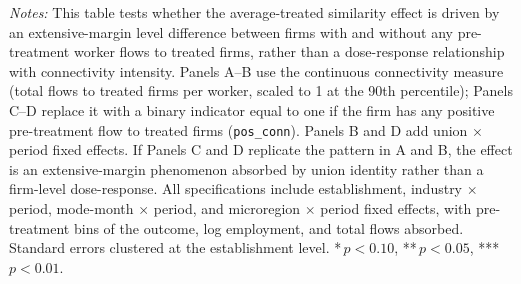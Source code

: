 \begin{table}[H]
\begin{minipage}{\linewidth}
\scriptsize\textit{Notes:} This table tests whether the average-treated similarity effect is driven by an extensive-margin level difference between firms with and without any pre-treatment worker flows to treated firms, rather than a dose-response relationship with connectivity intensity. Panels A--B use the continuous connectivity measure (total flows to treated firms per worker, scaled to 1 at the 90th percentile); Panels C--D replace it with a binary indicator equal to one if the firm has any positive pre-treatment flow to treated firms (\texttt{pos\_conn}). Panels B and D add union $\times$ period fixed effects. If Panels C and D replicate the pattern in A and B, the effect is an extensive-margin phenomenon absorbed by union identity rather than a firm-level dose-response. All specifications include establishment, industry $\times$ period, mode-month $\times$ period, and microregion $\times$ period fixed effects, with pre-treatment bins of the outcome, log employment, and total flows absorbed. Standard errors clustered at the establishment level. *\,$p<0.10$, **\,$p<0.05$, ***\,$p<0.01$.
\end{minipage}
\end{table}
